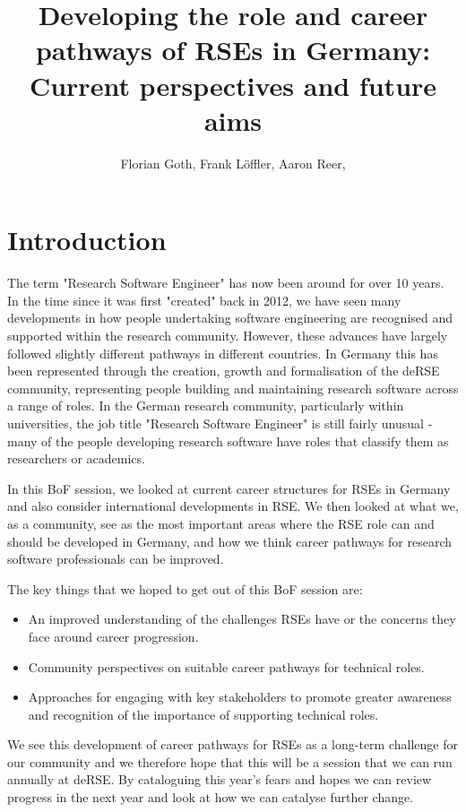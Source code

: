 \documentclass{eceasst}
\title{Developing the role and career pathways of RSEs in Germany: Current perspectives and future aims }
\author{
Florian Goth\authorOrcid{0000-0003-2707-4790}\authorRef{2},
Frank Löffler\authorOrcid{0000-0001-6643-6323}\authorRef{3},
Aaron Reer\authorOrcid{0000-0000-0000-0000}\authorRef{4},
} %
\institute{%
\autlabel{2} Institut für theoretische Physik 1, University of Würzburg, 97074, Würzburg,\\
\autlabel{3} Heinz Nixdorf Chair for Distributed Information Systems, Jena, Germany\\
\autlabel{4} GI, Berlin, Germany\\
\autlabel{5} Another Place\\
}
\begin{document}
\maketitle

\section{Introduction}
The term "Research Software Engineer" has now been around for over 10 years. In the time since it was first "created" back in 2012, we have seen many developments in how people undertaking software engineering are recognised and supported within the research community. However, these advances have largely followed slightly different pathways in different countries. In Germany this has been represented through the creation, growth and formalisation of the deRSE community, representing people building and maintaining research software across a range of roles. In the German research community, particularly within universities, the job title "Research Software Engineer" is still fairly unusual - many of the people developing research software have roles that classify them as researchers or academics.

In this BoF session, we looked at current career structures for RSEs in Germany and also consider international developments in RSE. We then looked at what we, as a community, see as the most important areas where the RSE role can and should be developed in Germany, and how we think career pathways for research software professionals can be improved.

The key things that we hoped to get out of this BoF session are:

\begin{itemize}

\item An improved understanding of the challenges RSEs have or the concerns they face around career progression.

\item Community perspectives on suitable career pathways for technical roles.

\item Approaches for engaging with key stakeholders to promote greater awareness and recognition of the importance of supporting technical roles.
\end{itemize}

We see this development of career pathways for RSEs as a long-term challenge for our community
and we therefore hope that this will be a session that we can run annually at deRSE.
By cataloguing this year's fears and hopes we can review progress in the next year and look at how we can catalyse further change.\\
\end{document}
